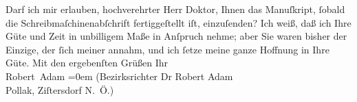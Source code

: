 \begin{ledgroupsized}[t]{13cm}
           \pstart
           {\pb}Darf ich mir erlauben, hochverehrter Herr
                    Doktor, Ihnen das Manuſkript, ſobald die Schreibmaſchinenabſchrift
                    fertiggeſtellt iſt, einzuſenden?\pend
           \pstart
           Ich weiß, daß ich Ihre Güte und Zeit in unbilligem Maße in Anſpruch nehme; aber
                    Sie waren bisher der Einzige, der ſich meiner annahm, und ich ſetze meine ganze
                    Hoffnung in Ihre Güte.\pend
           \pstart
           Mit den ergebenſten Grüßen\pend
           \pstart
           Ihr{\\[\baselineskip]}\spacefill\mbox{Robert Adam}\pend
           \leftskip=0em{}\pstart
           \noindent{}\raggedleft{}(Bezirksrichter Dr Robert Adam{\\}Pollak, Ziſtersdorf{ }\textsc{N. Ö.})\pend
           
         
         \endnumbering{}\end{ledgroupsized}  \newcommand{\dateiname}{L02117}\newcommand{\titel}{Robert Adam an Arthur Schnitzler, 2. 4. 1913}\newcommand{\editorInnen}{Martin Anton Müller und Gerd-Hermann Susen}
      